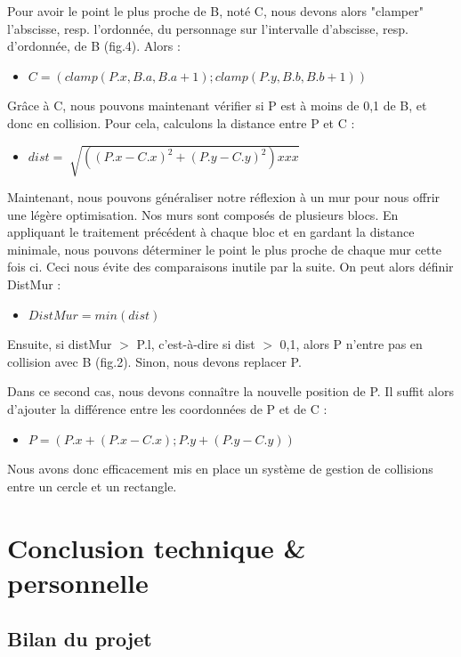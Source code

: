 \documentclass[12pt]{report}
\begin{document}
Pour avoir le point le plus proche de B, noté C, nous devons alors "clamper" 
l'abscisse, resp. l'ordonnée, du personnage sur l'intervalle d'abscisse, 
resp. d'ordonnée, de B (fig.4). Alors :

\begin{itemize}
	\item[] $C = (clamp(P.x, B.a, B.a +1) ; clamp(P.y, B.b, B.b +1))$
\end{itemize}

Grâce à C, nous pouvons maintenant vérifier si P est à moins de 0,1 de B, 
et donc en collision. Pour cela, calculons la distance entre P et C :

\begin{itemize}
	\item[] $dist = \sqrt[]{((P.x - C.x)^2 + (P.y - C.y)^2) xx  x}$
\end{itemize}

Maintenant, nous pouvons généraliser notre réflexion à un mur pour nous 
offrir une légère optimisation. Nos murs sont composés de plusieurs blocs. 
En appliquant le traitement précédent à chaque bloc et en gardant la 
distance minimale, nous pouvons déterminer le point le plus proche de 
chaque mur cette fois ci. Ceci nous évite des comparaisons inutile par la 
suite. On peut alors définir DistMur :

\begin{itemize}
	\item[] $DistMur = min(dist)$
\end{itemize}


Ensuite, si distMur $>$ P.l, c'est-à-dire si dist $>$ 0,1, alors P n'entre pas 
en collision avec B (fig.2). Sinon, nous devons replacer P.

Dans ce second cas, nous devons connaître la nouvelle position de P. Il 
suffit alors d'ajouter la différence entre les coordonnées de P et de C :

\begin{itemize}
	\item[] $P = (P.x + (P.x - C.x) ; P.y + (P.y - C.y))$
\end{itemize}

Nous avons donc efficacement mis en place un système de gestion de 
collisions entre un cercle et un rectangle.

    
\section{Conclusion technique \& personnelle}
\subsection{Bilan du projet}
\end{document}
